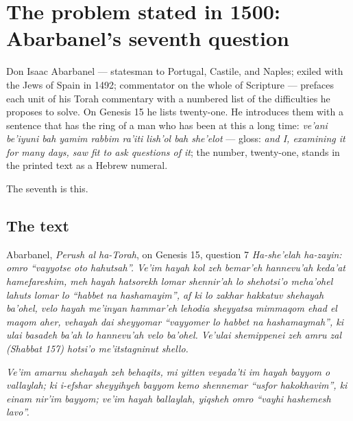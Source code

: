 \section{The problem stated in 1500: Abarbanel's seventh question}

Don Isaac Abarbanel --- statesman to Portugal, Castile, and Naples; exiled with
the Jews of Spain in 1492; commentator on the whole of Scripture --- prefaces
each unit of his Torah commentary with a numbered list of the difficulties he
proposes to solve. On Genesis 15 he lists twenty-one. He introduces them with a
sentence that has the ring of a man who has been at this a long time:
\textit{ve'ani be'iyuni bah yamim rabbim ra'iti lish'ol bah she'elot} ---
gloss: \emph{and I, examining it for many days, saw fit to ask questions of
it}; the number, twenty-one, stands in the printed text as a Hebrew numeral.

The seventh is this.

\subsection{The text}

\begin{studybox}{Abarbanel, \textit{Perush al ha-Torah}, on Genesis 15, question 7}
\textit{Ha-she'elah ha-zayin: omro ``vayyotse oto hahutsah''. Ve'im hayah kol
zeh bemar'eh hannevu'ah keda'at hamefareshim, meh hayah hatsorekh lomar
shennir'ah lo shehotsi'o meha'ohel lahuts lomar lo ``habbet na hashamayim'',
af ki lo zakhar hakkatuv shehayah ba'ohel, velo hayah me'inyan hammar'eh
lehodia sheyyatsa mimmaqom ehad el maqom aher, vehayah dai sheyyomar
``vayyomer lo habbet na hashamaymah'', ki ulai basadeh ba'ah lo hannevu'ah velo
ba'ohel. Ve'ulai shemippenei zeh amru zal (Shabbat 157) hotsi'o me'itstagninut
shello.}

\medskip

\textit{Ve'im amarnu shehayah zeh behaqits, mi yitten veyada'ti im hayah bayyom
o vallaylah; ki i-efshar sheyyihyeh bayyom kemo shennemar ``usfor
hakokhavim'', ki einam nir'im bayyom; ve'im hayah ballaylah, yiqsheh omro
``vayhi hashemesh lavo''.}
\end{studybox}


